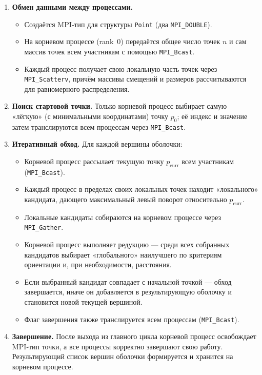 \documentclass[12pt,a4paper]{article}
\begin{document}
\begin{enumerate}
  \item \textbf{Обмен данными между процессами.}  
    \begin{itemize}
      \item Создаётся MPI‑тип для структуры \texttt{Point} (два \texttt{MPI\_DOUBLE}).  
      \item На корневом процессе (rank 0) передаётся общее число точек \(n\) и сам массив точек всем участникам с помощью \texttt{MPI\_Bcast}.  
      \item Каждый процесс получает свою локальную часть точек через \texttt{MPI\_Scatterv}, причём массивы смещений и размеров рассчитываются для равномерного распределения.
    \end{itemize}

  \item \textbf{Поиск стартовой точки.}  
    Только корневой процесс выбирает самую «лёгкую» (с минимальными координатами) точку \(p_0\); её индекс и значение затем транслируются всем процессам через \texttt{MPI\_Bcast}.

  \item \textbf{Итеративный обход.}  
    Для каждой вершины оболочки:
    \begin{itemize}
      \item Корневой процесс рассылает текущую точку \(p_{\mathrm{curr}}\) всем участникам (\texttt{MPI\_Bcast}).  
      \item Каждый процесс в пределах своих локальных точек находит «локального» кандидата, дающего максимальный левый поворот относительно \(p_{\mathrm{curr}}\).  
      \item Локальные кандидаты собираются на корневом процессе через \texttt{MPI\_Gather}.  
      \item Корневой процесс выполняет редукцию — среди всех собранных кандидатов выбирает «глобального» наилучшего по критериям ориентации и, при необходимости, расстояния.  
      \item Если выбранный кандидат совпадает с начальной точкой — обход завершается, иначе он добавляется в результирующую оболочку и становится новой текущей вершиной.  
      \item Флаг завершения также транслируется всем процессам (\texttt{MPI\_Bcast}).
    \end{itemize}

  \item \textbf{Завершение.}  
    После выхода из главного цикла корневой процесс освобождает MPI‑тип точки, а все процессы корректно завершают свою работу. Результирующий список вершин оболочки формируется и хранится на корневом процессе.


\end{enumerate}
\end{document}
